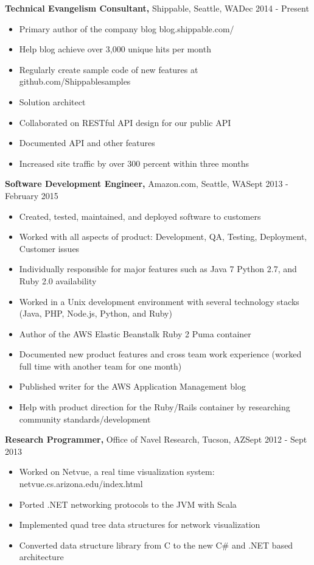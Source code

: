 \documentclass{res}
\begin{document}
\begin{resume}
  {\bf Technical Evangelism Consultant,} Shippable, Seattle, WA\hfill Dec 2014 - Present
  \begin{itemize} \itemsep -2pt  %
    \item Primary author of the company blog blog.shippable.com/
    \item Help blog achieve over 3,000 unique hits per month
    \item Regularly create sample code of new features at github.com/Shippablesamples
    \item Solution architect
    \item Collaborated on RESTful API design for our public API
    \item Documented API and other features
    \item Increased site traffic by over 300 percent within three months
  \end{itemize}

  {\bf Software Development Engineer,} Amazon.com, Seattle, WA\hfill Sept 2013 - February 2015
  \begin{itemize} \itemsep -2pt  %
    \item Created, tested, maintained, and deployed software to customers
    \item Worked with all aspects of product: Development, QA, Testing, Deployment, Customer issues
    \item Individually responsible for major features such as Java 7 Python 2.7, and Ruby 2.0 availability
    \item Worked in a Unix development environment with several technology stacks (Java, PHP, Node.js, Python, and Ruby)
    \item Author of the AWS Elastic Beanstalk Ruby 2 Puma container
    \item Documented new product features and cross team work experience (worked full time with another team for one month)
    \item Published writer for the AWS Application Management blog
    \item Help with product direction for the Ruby/Rails container by researching community standards/development
  \end{itemize}

  {\bf Research Programmer,} Office of Navel Research, Tucson, AZ\hfill Sept 2012 - Sept 2013
  \begin{itemize} \itemsep -2pt %
    \item Worked on Netvue, a real time visualization system: netvue.cs.arizona.edu/index.html
    \item Ported .NET networking protocols to the JVM with Scala
    \item Implemented quad tree data structures for network visualization
    \item Converted data structure library from C to the new C\# and .NET based architecture
  \end{itemize}


\end{resume}
\end{document}
